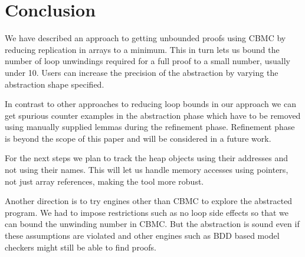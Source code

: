 \section{Conclusion}

We have described an approach to getting unbounded proofs using CBMC
by reducing replication in arrays to a minimum. This in turn lets us
bound the number of loop unwindings required for a full proof to a
small number, usually under 10. Users can increase the precision of
the abstraction by varying the abstraction shape specified.

In contrast to other approaches to reducing loop bounds in our
approach we can get spurious counter examples in the abstraction phase
which have to be removed using manually supplied lemmas during the
refinement phase. Refinement phase is beyond the scope of this paper
and will be considered in a future work.

For the next steps we plan to track the heap objects using their
addresses and not using their names. This will let us handle memory
accesses using pointers, not just array references, making the tool
more robust.

Another direction is to try engines other than CBMC to explore the
abstracted program. We had to impose restrictions such as no loop side
effects so that we can bound the unwinding number in CBMC. But the
abstraction is sound even if these assumptions are violated and other
engines such as BDD based model checkers might still be able to find proofs.

